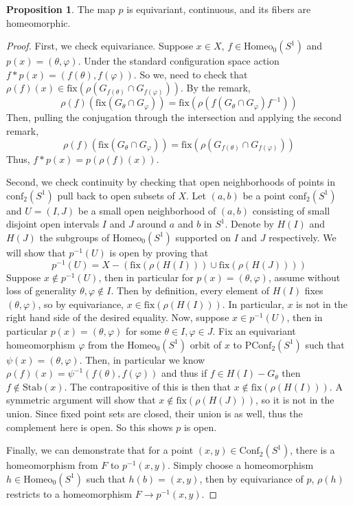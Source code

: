 \documentclass[10pt, oneside]{article}
\newcommand{\homeoS}{\text{Homeo}_0(S^1)}
\newcommand{\conf}[1]{\text{Conf}_{#1}(S^1)}
\newcommand{\pconf}[1]{\text{PConf}_{#1}(S^1)}
\theoremstyle{definition}
\newtheorem{prop}{Proposition}
\theoremstyle{definition}
\begin{document}
\begin{prop}
    The map $p$ is equivariant, continuous, and its fibers are homeomorphic.
\end{prop}
\begin{proof}
    First, we check equivariance. Suppose $x\in X$, $f\in\homeoS$ and $p(x)=(\theta, \varphi)$. Under the standard configuration space action $f*p(x) = (f(\theta), f(\varphi))$. So we, need to check that $\rho(f)(x)\in \text{fix}(\rho(G_{f(\theta)}\cap G_{f(\varphi)}))$. By the remark, $$\rho(f)(\text{fix}(G_\theta \cap G_\varphi)) = \text{fix}(\rho(f(G_\theta\cap G_\varphi)f^{-1}))$$
    Then, pulling the conjugation through the intersection and applying the second remark,
    $$\rho(f)(\text{fix}(G_\theta \cap G_\varphi)) = \text{fix}(\rho(G_{f(\theta)}\cap G_{f(\varphi)}))$$
    Thus, $f*p(x) = p(\rho(f)(x))$.

    Second, we check continuity by checking that open neighborhoods of points in $\text{conf}_2(S^1)$ pull back to open subsets of $X$. Let $(a, b)$ be a point $\text{conf}_2(S^1)$ and $U = (I, J)$ be a small open neighborhood of $(a,b)$ consisting of small disjoint open intervals $I$ and $J$ around $a$ and $b$ in $S^1$. Denote by $H(I)$ and $H(J)$ the subgroups of $\homeoS$ supported on $I$ and $J$ respectively. We will show that $p^{-1}(U)$ is open by proving that 
    $$p^{-1}(U) = X - \left(\text{fix}(\rho(H(I)))\cup\text{fix}(\rho(H(J)))\right)$$
    Suppose $x\notin p^{-1}(U)$, then in particular for $p(x) = (\theta, \varphi)$, assume without loss of generality $\theta, \varphi \notin I$. Then by definition, every element of $H(I)$ fixes $(\theta, \varphi)$, so by equivariance, $x\in \text{fix}(\rho(H(I)))$. In particular, $x$ is not in the right hand side of the desired equality. Now, suppose $x\in p^{-1}(U)$, then in particular $p(x) = (\theta, \varphi)$ for some $\theta\in I, \varphi\in J$. Fix an equivariant homeomorphism $\varphi$ from the $\homeoS$ orbit of $x$ to $\pconf{2}$ such that $\psi(x) = (\theta, \varphi)$. Then, in particular we know $\rho(f)(x) = \psi^{-1}(f(\theta), f(\varphi))$ and thus if $f\in H(I) - G_\theta$ then $f\notin \text{Stab}(x)$. The contrapositive of this is then that $x\notin \text{fix}(\rho(H(I)))$. A symmetric argument will show that $x\notin \text{fix}(\rho(H(J)))$, so it is not in the union. Since fixed point sets are closed, their union is as well, thus the complement here is open. So this shows $p$ is open.

    Finally, we can demonstrate that for a point $(x,y)\in\conf{2}$, there is a homeomorphism from $F$ to $p^{-1}(x, y)$. Simply choose a homeomorphism $h\in\homeoS$ such that $h(b) = (x, y)$, then by equivariance of $p$, $\rho(h)$ restricts to a homeomorphism $F\to p^{-1}(x,y)$.
\end{proof}
\end{document}
